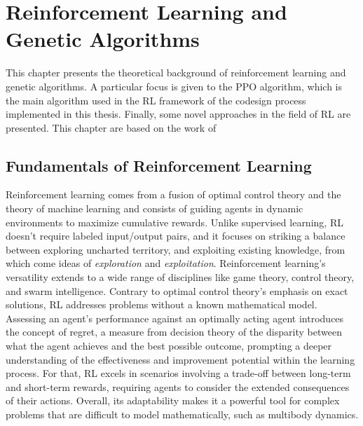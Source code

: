 \chapter{Reinforcement Learning and Genetic Algorithms}
\label{chp:back_RLGA}

This chapter presents the theoretical background of reinforcement learning and genetic algorithms. A particular focus is given to the \ac{PPO} algorithm, which is the main algorithm used in the \ac{RL} framework of the codesign process implemented in this thesis. Finally, some novel approaches in the field of \ac{RL} are presented. This chapter are based on the work of \citet{sutton_reinforcement_1998,li_deep_2018,agarwal_deep_2022,holland_1992_ga}

\section{Fundamentals of Reinforcement Learning}

Reinforcement learning comes from a fusion of optimal control theory and the theory of machine learning and consists of guiding agents in dynamic environments to maximize cumulative rewards. Unlike supervised learning, \ac{RL} doesn't require labeled input/output pairs, and it focuses on striking a balance between exploring uncharted territory, and exploiting existing knowledge, from which come ideas of \textit{exploration} and \textit{exploitation}. Reinforcement learning's versatility extends to a wide range of disciplines like game theory, control theory, and swarm intelligence. Contrary to optimal control theory's emphasis on exact solutions, \ac{RL} addresses problems without a known mathematical model. Assessing an agent's performance against an optimally acting agent introduces the concept of regret, a measure from decision theory of the disparity between what the agent achieves and the best possible outcome, prompting a deeper understanding of the effectiveness and improvement potential within the learning process. For that, \ac{RL} excels in scenarios involving a trade-off between long-term and short-term rewards, requiring agents to consider the extended consequences of their actions. Overall, its adaptability makes it a powerful tool for complex problems that are difficult to model mathematically, such as multibody dynamics.

